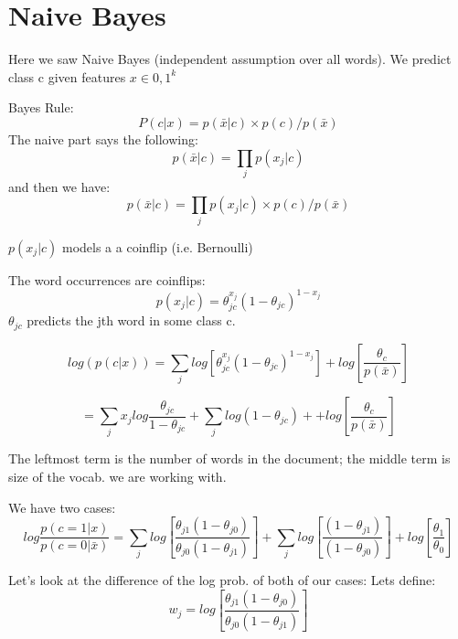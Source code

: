 
\section{Naive Bayes}
Here we saw Naive Bayes (independent assumption over all words). We predict class c given features $x \in{0, 1}^{k}$

Bayes Rule:
\begin{equation}
P( c|x) = p(\bar{x}|c)\times{p(c)/p(\bar{x})}
\end{equation}
The naive part says the following:  
\begin{equation}
p(\bar{x}|c)=\prod_{j}{ p(x_{j}|c)}
\end{equation}
and then we have:
\begin{equation}
 p(\bar{x}|c)=\prod_{j}{ p(x_{j}|c)}\times{p(c)/p(\bar{x})}
\end{equation}

$p(x_{j}|c)$ models a a coinflip (i.e. Bernoulli)

The word occurrences are coinflips:
\begin{equation}
p(x_{j}|c)=\theta_{jc}^{x_{j}}(1-\theta_{jc})^{1-x_{j}}
\end{equation}
$\theta_{jc}$ predicts the jth word in some class c.

 \begin{equation}
 log(p(c|x)) = \sum\limits_{j}log[\theta_{jc}^{x_{j}}(1-\theta_{jc})^{1-x_{j}}] + log [\frac{\theta_{c}}{p(\bar{x})}]
 \end{equation}
 
 \begin{equation}
= \sum\limits_{j}x_{j}log\frac{\theta_{jc}}{1-\theta_{jc}} +
 \sum\limits_{j} log(1-\theta_{jc}) + + log [\frac{\theta_{c}}{p(\bar{x})}]
 \end{equation}
 
The leftmost term is the number of words in the document; the middle term is size of the vocab. we are working with. 

We have two cases:
\begin{equation}
log\frac{p(c=1|x)}{p(c=0|\bar{x})} = \sum\limits_{j}log[\frac{\theta_{j1}(1-\theta_{j0})}{\theta_{j0}(1-\theta_{j1})}] + \sum\limits_{j}log[\frac{(1-\theta_{j1})}{(1-\theta_{j0})}] + log[\frac{\theta_{1}}{\theta_{0}}]
\end{equation}

Let's look at the difference of the log prob. of both of our cases:
Lets define:
\begin{equation}
w_{j} = log[\frac{\theta_{j1}(1-\theta_{j0})}{\theta_{j0}(1-\theta_{j1})}]
\end{equation}

